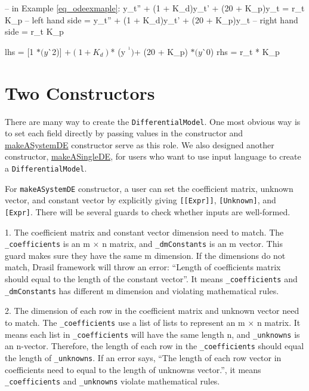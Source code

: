 \begin{listing}[ht]
\begin{haskell1}
-- in Example \ref{eq_odeexmaple}: y\_t'' + (1 + K\_d)y\_t' + (20 + K\_p)y\_t = r\_t K\_p
-- left hand side = y\_t'' + (1 + K\_d)y\_t' + (20 + K\_p)y\_t 
-- right hand side = r\_t K\_p

lhs = [1 $* (y $^^ 2)]
	$+ (1 + K_d) $* (y $^^ 1)
	$+ (20 + K_p) $* (y $^^ 0)
rhs = r_t * K_p
\end{haskell1}
\label{code_exinputl}
\end{listing}

\section{Two Constructors}
There are many way to create the \verb|DifferentialModel|. One most obvious way is to set each field directly by passing values in the constructor and \href{https://jacquescarette.github.io/Drasil/docs/full/drasil-lang-0.1.60.0/Language-Drasil-Chunk-DifferentialModel.html#t:makeASystemDE}{makeASystemDE} constructor serve as this role. We also designed another constructor, \href{https://jacquescarette.github.io/Drasil/docs/full/drasil-lang-0.1.60.0/Language-Drasil-Chunk-DifferentialModel.html#t:makeASingleDE}{makeASingleDE}, for users who want to use input language to create a \verb|DifferentialModel|.

For \verb|makeASystemDE| constructor, a user can set the coefficient matrix, unknown vector, and constant vector by explicitly giving \verb|[[Expr]]|, \verb|[Unknown]|, and \verb|[Expr]|. There will be several guards to check whether inputs are well-formed.

1. The coefficient matrix and constant vector dimension need to match. The \verb|_coefficients| is an m $\times$ n matrix, and \verb|_dmConstants| is an m vector. This guard makes sure they have the same m dimension. If the dimensions do not match, Drasil framework will throw an error: ``Length of coefficients matrix should equal to the length of the constant vector''. It means \verb|_coefficients| and \verb|_dmConstants| has different m dimension and violating mathematical rules.

2. The dimension of each row in the coefficient matrix and unknown vector need to match. The \verb|_coefficients| use a list of lists to represent an m $\times$ n matrix. It means each list in \verb|_coefficients| will have the same length n, and \verb|_unknowns| is an n-vector. Therefore, the length of each row in the \verb|_coefficients| should equal the length of \verb|_unknowns|. If an error says, ``The length of each row vector in coefficients need to equal to the length of unknowns vector.'', it means \verb|_coefficients| and \verb|_unknowns| violate mathematical rules.

